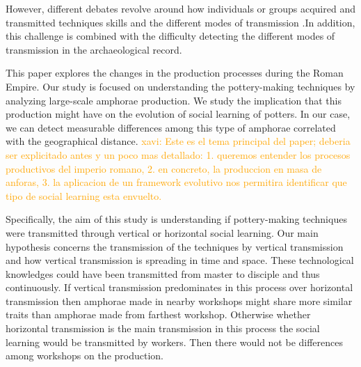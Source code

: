 \documentclass[review]{elsarticle}
\newcommand{\memo}[2]{\textcolor{#1}{#2}}
\newcommand{\xavi}[1]{\memo{orange}{xavi: #1\\}}
\begin{document}
However, different debates revolve around how individuals or groups acquired and transmitted techniques skills and the different modes of transmission   \citep{bowser_learning_2008, mesoudi_cultural_2008, roux_standardization_2015}.In  addition, this challenge is combined with the difficulty detecting the different modes of transmission in the archaeological record.     



                              

This paper explores the changes in the production processes during the Roman Empire. Our study is focused on understanding the pottery-making techniques by analyzing large-scale amphorae production. We study the implication that this production might have on the evolution of social learning of potters. In our case, we can detect measurable differences among this type of amphorae correlated with the geographical distance. 
\xavi{Este es el tema principal del paper; deberia ser explicitado antes y un poco mas detallado: 1. queremos entender los procesos productivos del imperio romano, 2. en concreto, la produccion en masa de anforas, 3. la aplicacion de un framework evolutivo nos permitira identificar que tipo de social learning esta envuelto.}


Specifically, the aim of this study is understanding if pottery-making techniques were transmitted through vertical or horizontal social learning. Our main hypothesis concerns the transmission of the techniques by vertical transmission and how vertical transmission is spreading in time and space. These technological knowledges could have been transmitted from master to disciple and thus continuously. If vertical transmission predominates in this process over horizontal transmission then amphorae made in nearby workshops might share more similar traits than amphorae made from farthest workshop. Otherwise whether horizontal transmission is the main transmission in this process the social learning would be transmitted by workers. Then there would not be differences among workshops on the production.     
\end{document}
